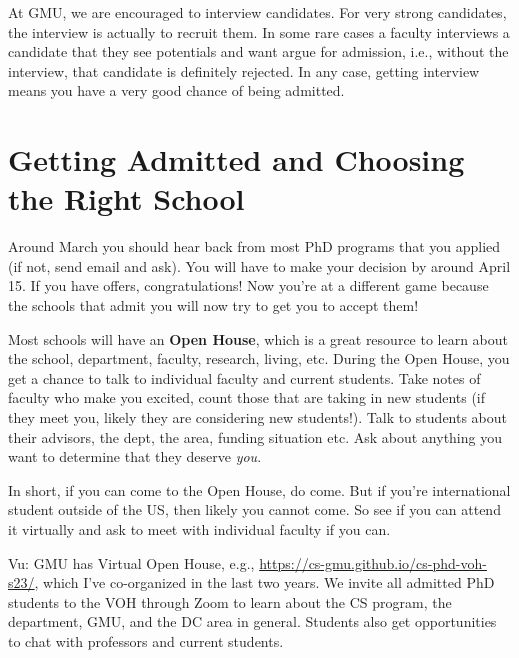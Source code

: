 \documentclass[10pt]{article}
\begin{document}
\begin{tcolorbox}[left=1pt,right=1pt,top=1pt,bottom=1pt]
At GMU, we are encouraged to interview candidates. For very strong candidates, the interview is actually to recruit them.  In some rare cases a faculty interviews a candidate that they see potentials and want argue for admission, i.e., without the interview, that candidate is definitely rejected. In any case, getting interview means you have a very good chance of being admitted.
\end{tcolorbox}

\section{Getting Admitted and Choosing the Right School}

Around March you should hear back from most PhD programs that you applied (if not, send email and ask). You will have to make your decision by around April 15.
If you have offers, congratulations!  Now you're at a different game because the schools that admit you will now try to get you to accept them!  

Most schools will have an \textbf{Open House}, which is a great resource to learn about the school, department, faculty, research, living, etc. During the Open House, you get a chance to talk to individual faculty and current students.  Take notes of faculty who make you excited, count those that are taking in new students (if they meet you, likely they are considering new students!).  Talk to students about their advisors, the dept, the area, funding situation etc.  Ask about anything you want to determine that they deserve \emph{you}.

In short, if you can come to the Open House, do come.  But if you're international student outside of the US, then likely you cannot come.  So see if you can attend it virtually and ask to meet with individual faculty if you can.

\begin{tcolorbox}[left=1pt,right=1pt,top=1pt,bottom=1pt]
Vu: GMU has Virtual Open House, e.g., \url{https://cs-gmu.github.io/cs-phd-voh-s23/}, which I've co-organized in the last two years. We invite all admitted PhD students to the VOH through Zoom to learn about the CS program, the department, GMU, and the DC area in general. Students also get opportunities to chat with professors and current students.
\end{tcolorbox}
\end{document}
